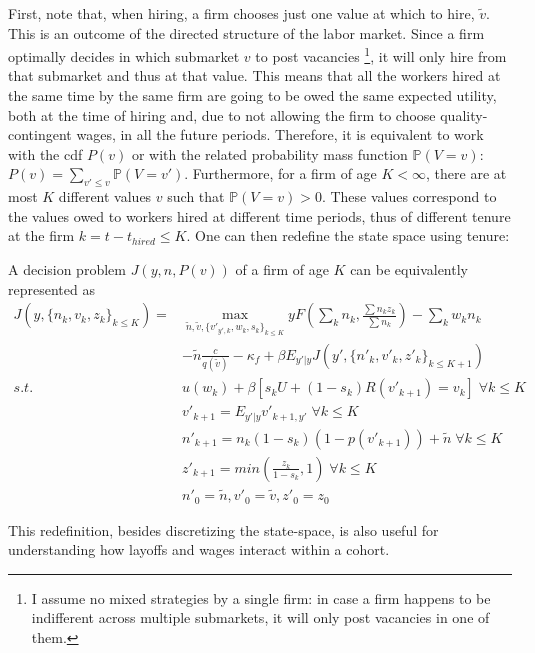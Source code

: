 First, note that, when hiring, a firm chooses just one value at which to hire, $\tilde{v}$. This is an outcome of the directed structure of the labor market. Since a firm optimally decides in which submarket $v$ to post vacancies \footnote{I assume no mixed strategies by a single firm: in case a firm happens to be indifferent across multiple submarkets, it will only post vacancies in one of them.}, it will only hire from that submarket and thus at that value. This means that all the workers hired at the same time by the same firm are going to be owed the same expected utility, both at the time of hiring and, due to not allowing the firm to choose quality-contingent wages, in all the future periods. Therefore, it is equivalent to work with the cdf $P(v)$ or with the related probability mass function $\mathbb{P}(V=v)$: $P(v)=\sum_{v'\leq v}\mathbb{P}(V=v')$. 
Furthermore, for a firm of age $K<\infty$, there are at most $K$ different values $v$ such that $\mathbb{P}(V=v)>0$. These values correspond to the values owed to workers hired at different time periods, thus of different tenure at the firm $k=t-t_{hired}\leq K$.  One can then redefine the state space using tenure: 
\begin{lemma} \label{firmproblem}
A decision problem $J(y,n,P(v))$ of a firm of age $K$ can be equivalently represented as
\begin{equation*}
    \begin{split}
 J(y,\{n_k,v_k,z_k\}_{k\leq K}) =
    & \max_{\tilde{n},\tilde{v},\{v'_{y',k},w_{k},s_{k}\}_{k\leq K}} 
    yF(\sum_k n_k,\frac{\sum n_kz_k}{\sum n_k})-
    \sum_k w_kn_k \\
    &-\tilde{n}\frac{c}{q(\tilde{v})}-\kappa_f
    +\beta E_{y'|y} J(y',\{n'_k,v'_k,z'_k\}_{k\leq K+1}) \\
     s.t. \: & u(w_k) + \beta [s_k U + (1-s_k)R(v'_{k+1})=v_k] \; \forall k\leq K \\
    & v'_{k+1} = E_{y'|y} v'_{k+1,y'} \; \forall k\leq K \\
    & n'_{k+1} = n_k(1-s_k)(1-p(v'_{k+1}))+\tilde{n}\; \forall k\leq K \\
    & z'_{k+1} = min(\frac{z_k}{1-s_k},1)\; \forall k\leq K \\
    & n'_0 = \tilde{n}, v'_0 = \tilde{v}, z'_0 = z_0
    \end{split}
\end{equation*}
\end{lemma}
This redefinition, besides discretizing the state-space, is also useful for understanding how layoffs and wages interact within a cohort.
